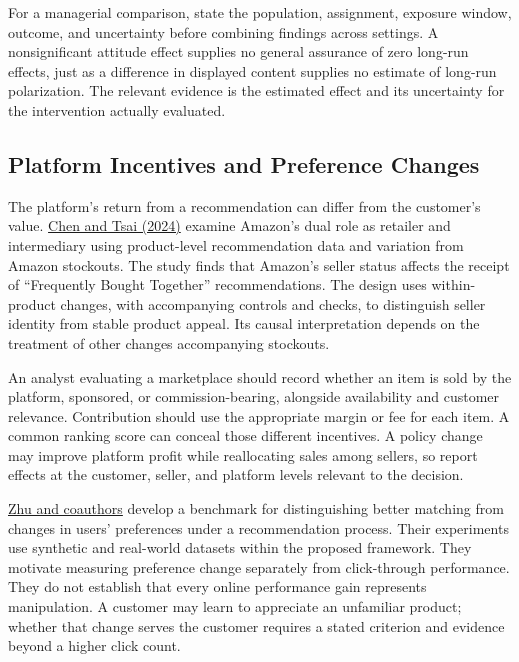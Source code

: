 For a managerial comparison, state the population, assignment, exposure
window, outcome, and uncertainty before combining findings across
settings. A nonsignificant attitude effect supplies no general assurance
of zero long-run effects, just as a difference in displayed content
supplies no estimate of long-run polarization. The relevant evidence is
the estimated effect and its uncertainty for the intervention actually
evaluated.

\hypertarget{M08-platform-incentives-and-preference-changes}{%
\subsection{Platform Incentives and Preference
Changes}\label{M08-platform-incentives-and-preference-changes}}

\noindent The platform's return from a recommendation can differ from the
customer's value. \href{https://doi.org/10.1111/1756-2171.12481}{Chen
and Tsai (2024)} examine Amazon's dual role as retailer and intermediary
using product-level recommendation data and variation from Amazon
stockouts. The study finds that Amazon's seller status affects the
receipt of ``Frequently Bought Together'' recommendations. The design
uses within-product changes, with accompanying controls and checks, to
distinguish seller identity from stable product appeal. Its causal
interpretation depends on the treatment of other changes accompanying
stockouts.

An analyst evaluating a marketplace should record whether an item is
sold by the platform, sponsored, or commission-bearing, alongside
availability and customer relevance. Contribution should use the
appropriate margin or fee for each item. A common ranking score can
conceal those different incentives. A policy change may improve platform
profit while reallocating sales among sellers, so report effects at the
customer, seller, and platform levels relevant to the decision.

\href{https://arxiv.org/abs/2210.05662v2}{Zhu and coauthors} develop a
benchmark for distinguishing better matching from changes in users'
preferences under a recommendation process. Their experiments use
synthetic and real-world datasets within the proposed framework. They
motivate measuring preference change separately from click-through
performance. They do not establish that every online performance gain
represents manipulation. A customer may learn to appreciate an
unfamiliar product; whether that change serves the customer requires a
stated criterion and evidence beyond a higher click count.

